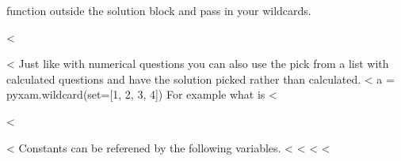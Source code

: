 \documentclass[12pt]{exam}
\begin{document}
\begin{questions}
                function outside the solution block and pass in your wildcards.
                \begin{solution}
                    <%
                \end{solution}
                <%
                Just like with numerical questions you can also use the pick from a list with calculated questions and
                have the solution picked rather than calculated.
<%
a = pyxam.wildcard(set=[1, 2, 3, 4])
                For example what is <%
                \begin{solution}
                    <%
                \end{solution}
                <%
                Constants can be referened by the following variables.
                <%
                <%
                <%
                <%
        \end{questions}
    
\end{document}
